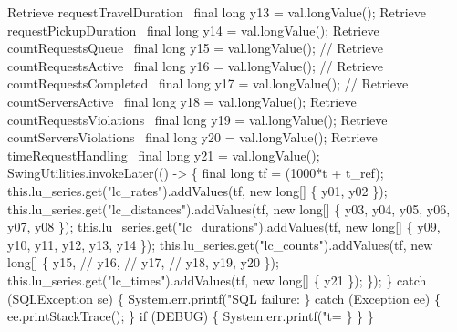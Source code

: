       \LA{}Retrieve requestTravelDuration~{\nwtagstyle{}}\RA{}     final long y13 = val.longValue();
      \LA{}Retrieve requestPickupDuration~{\nwtagstyle{}}\RA{}     final long y14 = val.longValue();
      \LA{}Retrieve countRequestsQueue~{\nwtagstyle{}}\RA{}        final long y15 = val.longValue();
//      \LA{}Retrieve countRequestsActive~{\nwtagstyle{}}\RA{}       final long y16 = val.longValue();
//      \LA{}Retrieve countRequestsCompleted~{\nwtagstyle{}}\RA{}    final long y17 = val.longValue();
//      \LA{}Retrieve countServersActive~{\nwtagstyle{}}\RA{}        final long y18 = val.longValue();
      \LA{}Retrieve countRequestsViolations~{\nwtagstyle{}}\RA{}   final long y19 = val.longValue();
      \LA{}Retrieve countServersViolations~{\nwtagstyle{}}\RA{}    final long y20 = val.longValue();
      \LA{}Retrieve timeRequestHandling~{\nwtagstyle{}}\RA{}       final long y21 = val.longValue();
      SwingUtilities.invokeLater(() -> \{
         final long tf = (1000*t + t_ref);
         this.lu_series.get("lc_rates").addValues(tf, new long[] \{
            y01,
            y02 \});
         this.lu_series.get("lc_distances").addValues(tf, new long[] \{
            y03,
            y04,
            y05,
            y06,
            y07,
            y08 \});
         this.lu_series.get("lc_durations").addValues(tf, new long[] \{
            y09,
            y10,
            y11,
            y12,
            y13,
            y14 \});
         this.lu_series.get("lc_counts").addValues(tf, new long[] \{
            y15,
//            y16,
//            y17,
//            y18,
            y19,
            y20 \});
         this.lu_series.get("lc_times").addValues(tf, new long[] \{
            y21 \});
      \});
    \} catch (SQLException se) \{
      System.err.printf("SQL failure: %
    \} catch (Exception ee) \{
      ee.printStackTrace();
    \}
    if (DEBUG) \{
      System.err.printf("t=%
    \}
  \}
\}
\nwendcode{}\nwdocspar

